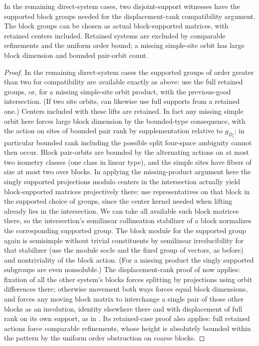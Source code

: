 \begin{lemma}\label{fa:direct-compatible}
In the remaining direct-system cases, two disjoint-support witnesses have the supported block groups
needed for the displacement-rank compatibility argument.  The block groups can be chosen as actual
block-supported matrices, with retained centers included.  Retained systems are excluded by comparable
refinements and the uniform order bound; a missing simple-site orbit has large block dimension and
bounded pair-orbit count.
\end{lemma}

\begin{proof}

In the remaining direct-system cases the supported groups of order greater than two for compatibility are
available exactly as above: use the full retained groups, or, for a missing simple-site orbit product,
 with the previous-good intersection. (If two site orbits, can
likewise use full supports from a retained one.) Centers included with these lifts are retained. In fact
any missing simple orbit here forces large block dimension by the bounded-type consequence, with the
action on sites of bounded pair rank by supplementation relative to \(g_{D_i}\); in particular bounded
rank including the possible split four-space ambiguity cannot then occur. Block pair-orbits are bounded
by the alternating actions on at most two isometry classes (one class in linear type), and the simple
sites have fibers of size at most two over blocks. In applying the missing-product argument here the
singly supported projections modulo centers in the intersection actually yield block-supported matrices
projectively there: use representatives on that block in the supported choice of groups, since the center
kernel needed when lifting already lies in the intersection. We can take all available such block
matrices there, so the intersection's semilinear collineation stabilizer of a block normalizes the
corresponding supported group. The block module for the supported group again is semisimple without
trivial constituents by semilinear irreducibility for that stabilizer (use the module socle and the fixed
group of vectors, as before) and nontriviality of the block action. (For a missing product the singly
supported subgroups are even nonsoluble.) The displacement-rank proof of 
now applies: fixation of all the other system's blocks forces splitting by projections using orbit
differences there; otherwise movement both ways forces equal block dimensions, and forces any moving
block matrix to interchange a single pair of those other blocks as an involution, identity elsewhere
there and with displacement of full rank on its own support, as in .  Its
retained-case proof also applies: full retained actions force comparable refinements, whose height is
absolutely bounded within the pattern by the uniform order obstruction on coarse blocks.

\end{proof}

